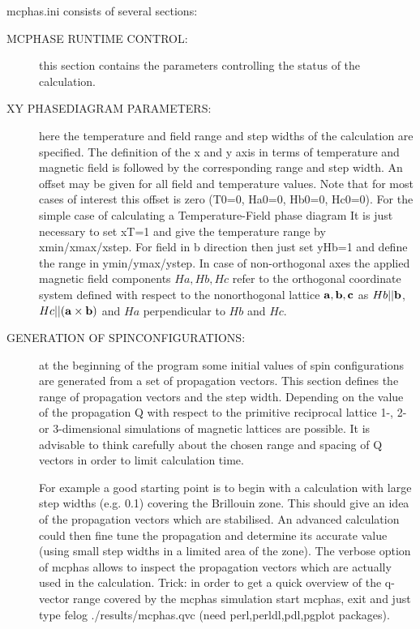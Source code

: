 {\prg mcphas.ini} consists of several sections:
\begin{description}
\item [MCPHASE RUNTIME CONTROL:] this section contains the parameters
controlling the status of the calculation.
\item [XY PHASEDIAGRAM PARAMETERS:] here the temperature and field range and
step widths of the calculation are specified.
The definition of the x and y
axis in terms of temperature and magnetic field is followed by the
corresponding range and step width. An offset may be given for all
field and temperature values.
Note that for most cases of interest
this offset is zero (T0=0, Ha0=0, Hb0=0, Hc0=0).
 For the simple case of calculating a Temperature-Field phase diagram
 It is just necessary to set xT=1 and give the temperature range by
xmin/xmax/xstep. For field in b direction then just set yHb=1 and 
define the range in ymin/ymax/ystep.
In case of non-orthogonal axes the applied magnetic field
components $Ha, Hb, Hc$ refer to the orthogonal coordinate system
defined with respect to the nonorthogonal lattice $\mathbf a,\mathbf b,\mathbf c$ as
$Hb||\mathbf b$, $Hc||(\mathbf a \times \mathbf b)$ and $Ha$ perpendicular to $Hb$ and $Hc$.

\item [GENERATION OF SPINCONFIGURATIONS:] at the beginning of the program
some initial values of spin configurations are generated from a set of 
propagation vectors. This section defines the range of propagation vectors
and the step width.
Depending on the value of the propagation Q with respect to the primitive reciprocal lattice
1-, 2- or 3-dimensional simulations of magnetic lattices
are possible. It is advisable to 
think carefully about the chosen range and spacing of Q vectors in order
to limit calculation time.
 
For example a good starting point is to begin with a calculation with large
step widths (e.g. 0.1)  covering the Brillouin zone. This should give an idea
of the propagation vectors which are stabilised. An advanced calculation
could then fine tune the propagation and determine its accurate value (using
small step widths in a limited area of the zone).
The verbose option of {\prg mcphas} allows to inspect the propagation vectors
which are actually used in the calculation.
Trick: in order to get a quick overview of the
q-vector range covered by the mcphas simulation start mcphas, exit and 
just type {\prg felog ./results/mcphas.qvc} (need {\prg perl,perldl,pdl,pgplot} packages).


\end{description}
